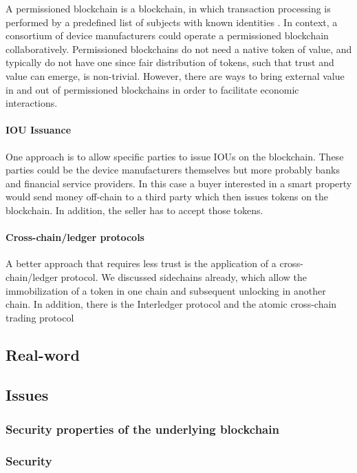 A permissioned blockchain is a blockchain, in which transaction processing is performed
by a predefined list of subjects with known identities \cite{BitFuryPermissioned2015}. In context, a consortium of device manufacturers could operate a permissioned blockchain collaboratively. Permissioned blockchains do not need a native token of value, and typically do not have one since fair distribution of tokens, such that trust and value can emerge, is non-trivial. However, there are ways to bring external value in and out of permissioned blockchains in order to facilitate economic interactions. 
\paragraph{IOU Issuance}
One approach is to allow specific parties to issue IOUs on the blockchain. These parties could be the device manufacturers themselves but more probably banks and financial service providers. In this case a buyer interested in a smart property would send money off-chain to a third party which then issues tokens on the blockchain. In addition, the seller has to accept those tokens. 

\paragraph{Cross-chain/ledger protocols}
A better approach that requires less trust is the application of a cross-chain/ledger protocol. We discussed sidechains already, which allow the immobilization of a token in one chain and subsequent unlocking in another chain. In addition, there is the Interledger protocol \cite{hope2016interledger} and the atomic cross-chain trading protocol \cite{atomiccrosschaintrading}

\subsection{Real-word}

\subsection{Issues}

\subsubsection{Security properties of the underlying blockchain}

\subsubsection{Security}



